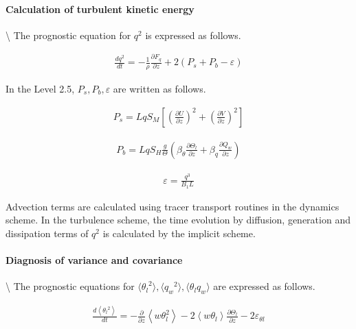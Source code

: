 \hypertarget{calculation-of-turbulent-kinetic-energy}{%
\paragraph{Calculation of turbulent kinetic
energy}\label{calculation-of-turbulent-kinetic-energy}}

\textbackslash{} The prognostic equation for \(q^2\) is expressed as
follows.

\begin{eqnarray} \frac{d q^2}{dt}=-\frac{1}{\rho}\frac{\partial F_q}{\partial z}+2\left(P_s+P_b-\varepsilon\right) \end{eqnarray}

In the Level 2.5, \(P_s,P_b,\varepsilon\) are written as follows.

\begin{eqnarray}P_s=Lq S_M \left[\left(\frac{\partial U}{\partial z}\right)^2+\left(\frac{\partial V}{\partial z}\right)^2\right]\end{eqnarray}

\begin{eqnarray}P_b=Lq S_H \frac{g}{\Theta}\left(\beta_\theta \frac{\partial \Theta_l}{\partial z}+\beta_q \frac{\partial Q_w}{\partial z}\right)\end{eqnarray}

\begin{eqnarray}\varepsilon=\frac{q^3}{B_1L}\end{eqnarray}

Advection terms are calculated using tracer transport routines in the
dynamics scheme. In the turbulence scheme, the time evolution by
diffusion, generation and dissipation terms of \(q^2\) is calculated by
the implicit scheme.

\hypertarget{diagnosis-of-variance-and-covariance}{%
\paragraph{Diagnosis of variance and
covariance}\label{diagnosis-of-variance-and-covariance}}

\textbackslash{} The prognostic equations for
\(\langle {\theta_l}^2 \rangle,\langle {q_w}^2 \rangle,\langle \theta_l q_w \rangle\)
are expressed as follows.

\begin{eqnarray}
\frac{d\left\langle{\theta_l}^{2}\right\rangle}{d t}=-\frac{\partial}{\partial z}\left\langle w \theta_{l}^{2}\right\rangle-2\left\langle w \theta_{l}\right\rangle \frac{\partial \Theta_{l}}{\partial z}-2 \varepsilon_{\theta l}
\end{eqnarray}

